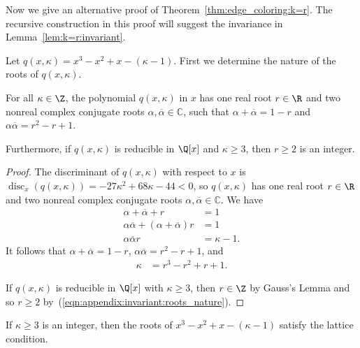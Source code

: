 \documentclass[11pt]{article}
\begin{document}
Now we give an alternative proof of Theorem~\ref{thm:edge_coloring:k=r}.
The recursive construction in this proof will suggest the invariance in Lemma~\ref{lem:k=r:invariant}.

Let $q(x,\kappa) = x^3 - x^2 + x - (\kappa - 1)$.
First we determine the nature of the roots of $q(x,\kappa)$.
 
\begin{lemma} \label{lem:invariant:roots_nature}
 For all $\kappa \in \Z$,
 the polynomial $q(x,\kappa)$ in $x$ has one real root $r \in \R$ and two nonreal complex conjugate roots $\alpha, \overline{\alpha} \in \mathbb{C}$,
 such that $\alpha + \overline{\alpha} = 1 - r$ and $\alpha \overline{\alpha} = r^2 - r + 1$.
 
 Furthermore,
 if $q(x,\kappa)$ is reducible in $\Q[x]$ and $\kappa \ge 3$,
 then $r \ge 2$ is an integer.
\end{lemma}

\begin{proof}
 The discriminant of $q(x,\kappa)$ with respect to $x$ is $\operatorname{disc}_x(q(x,\kappa)) = -27 \kappa^2 + 68 \kappa - 44 < 0$,
 so $q(x,\kappa)$ has one real root $r \in \R$ and two nonreal complex conjugate roots $\alpha, \overline{\alpha} \in \mathbb{C}$.
 We have
 \begin{align*}
  \alpha + \overline{\alpha} + r& = 1\\
  \alpha \overline{\alpha} + (\alpha + \overline{\alpha}) r &= 1\\
  \alpha \overline{\alpha} r & = \kappa - 1.
 \end{align*}
 It follows that $\alpha + \overline{\alpha} = 1 - r$,
 $\alpha \overline{\alpha} = r^2 - r + 1$,
 and
 \begin{align}
  \kappa &= r^3 - r^2 + r + 1. \label{eqn:appendix:invariant:roots_nature}
 \end{align}
 
 If $q(x,\kappa)$ is reducible in $\Q[x]$ with $\kappa \ge 3$,
 then $r \in \Z$ by Gauss's Lemma
 and so $r \ge 2$ by~(\ref{eqn:appendix:invariant:roots_nature}).
\end{proof}
 
\begin{lemma} \label{lem:appendix:satisfy_LC}
 If $\kappa \ge 3$ is an integer,
 then the roots of $x^3 - x^2 + x - (\kappa - 1)$ satisfy the lattice condition.
\end{lemma}
\end{document}
